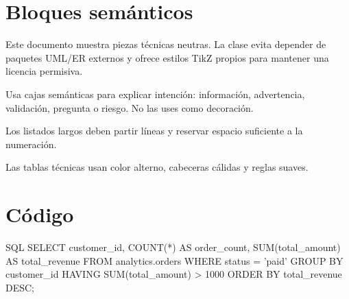 \documentclass{claudeeditorial}
\begin{document}
\BodyCopy

\ClaudeCover


\begin{tcbraster}[raster columns=3,raster equal height=rows,raster column skip=8pt]
\end{tcbraster}

\section{Bloques semánticos}


\begin{ClaudeInfo}[Contexto]
Este documento muestra piezas técnicas neutras. La clase evita depender de paquetes UML/ER externos y ofrece estilos TikZ propios para mantener una licencia permisiva.
\end{ClaudeInfo}

\begin{ClaudeTip}
Usa cajas semánticas para explicar intención: información, advertencia, validación, pregunta o riesgo. No las uses como decoración.
\end{ClaudeTip}

\begin{tcbraster}[raster columns=2,raster equal height=rows,raster column skip=10pt]
\begin{ClaudeWarning}
Los listados largos deben partir líneas y reservar espacio suficiente a la numeración.
\end{ClaudeWarning}

\begin{ClaudeCheck}[Validación]
Las tablas técnicas usan color alterno, cabeceras cálidas y reglas suaves.
\end{ClaudeCheck}
\end{tcbraster}

\section{Código}

\begin{ClaudeCode}[title={Consulta SQL con alias y ordenación}]{SQL}
SELECT
  customer_id,
  COUNT(*) AS order_count,
  SUM(total_amount) AS total_revenue
FROM analytics.orders
WHERE status = 'paid'
GROUP BY customer_id
HAVING SUM(total_amount) > 1000
ORDER BY total_revenue DESC;
\end{ClaudeCode}
\end{document}

